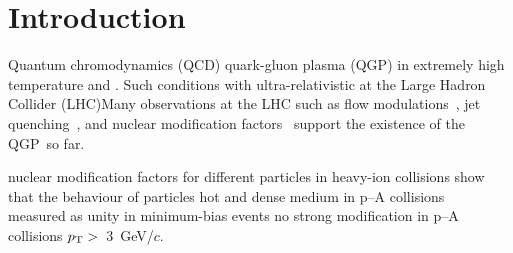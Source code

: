 
\section{Introduction}

\DIFaddbegin {}\DIFaddend Quantum chromodynamics (QCD) \DIFdelbegin {}\DIFdelend \DIFaddbegin {}\DIFaddend quark-gluon plasma (QGP) in extremely high temperature and \DIFdelbegin {}\DIFdelend \DIFaddbegin {}\DIFaddend . Such conditions \DIFdelbegin {}\DIFdelend \DIFaddbegin {}\DIFaddend with ultra-relativistic \DIFdelbegin {}\DIFdelend \DIFaddbegin {}\DIFaddend at the Large Hadron Collider (LHC)\DIFdelbegin {}\DIFdelend \DIFaddbegin {}\DIFaddend Many observations at the LHC such as flow modulations~\cite{Bhalerao:2020ulk, ALICE:2019zfl}, jet quenching~\cite{ALICE:2019qyj}, and nuclear modification factors~\cite{ALICE:2019hno} support the existence of the QGP~\cite{Adams:2005dq}\DIFaddbegin \DIFadd{, }\DIFaddend so far. 
\DIFdelbegin %

\DIFdelend %
\DIFaddbegin {}\DIFaddend nuclear modification factors for different particles in heavy-ion collisions show that the behaviour of particles \DIFdelbegin {}\DIFdelend \DIFaddbegin {}\DIFaddend hot and dense medium \DIFdelbegin {}\DIFdelend \DIFaddbegin {}\DIFaddend in p--A collisions~\cite{ALICE:2016dei} \DIFdelbegin {}\DIFdelend \DIFaddbegin {}\DIFaddend measured as unity in minimum-bias events \DIFdelbegin {}\DIFdelend \DIFaddbegin {}\DIFaddend no strong modification in p--A collisions \DIFdelbegin {}\DIFdelend \DIFaddbegin {}\DIFaddend $p_{\rm{T}}>$~3~GeV/$c$\DIFaddbegin \DIFadd{)}\DIFaddend . 


